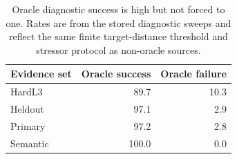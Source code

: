 \begin{table}[t]
\centering
\caption{Oracle diagnostic success is high but not forced to one. Rates are from the stored diagnostic sweeps and reflect the same finite target-distance threshold and stressor protocol as non-oracle sources.}
\label{tab:oracle-diagnostic-success}
\scriptsize
\begin{tabular}{lrr}
\toprule
Evidence set & Oracle success & Oracle failure \\
\midrule
HardL3 & 89.7 & 10.3 \\
Heldout & 97.1 & 2.9 \\
Primary & 97.2 & 2.8 \\
Semantic & 100.0 & 0.0 \\
\bottomrule
\end{tabular}
\end{table}
